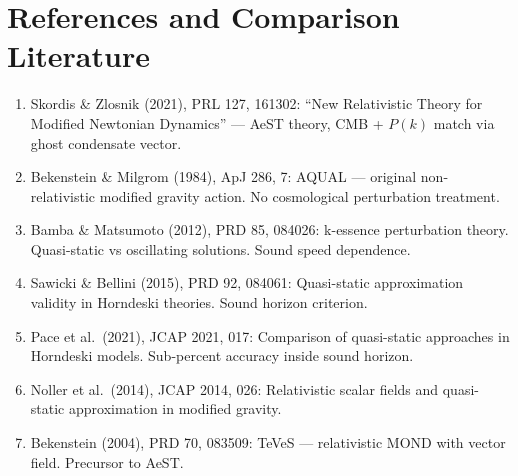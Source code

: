 \documentclass[11pt]{article}
\begin{document}
\section*{References and Comparison Literature}

\begin{enumerate}[nosep]
\item Skordis \& Zlosnik (2021), PRL 127, 161302: ``New Relativistic
  Theory for Modified Newtonian Dynamics'' --- AeST theory, CMB + $P(k)$
  match via ghost condensate vector.
\item Bekenstein \& Milgrom (1984), ApJ 286, 7: AQUAL --- original
  non-relativistic modified gravity action. No cosmological perturbation
  treatment.
\item Bamba \& Matsumoto (2012), PRD 85, 084026: k-essence perturbation
  theory. Quasi-static vs oscillating solutions. Sound speed dependence.
\item Sawicki \& Bellini (2015), PRD 92, 084061: Quasi-static
  approximation validity in Horndeski theories. Sound horizon criterion.
\item Pace et al.\ (2021), JCAP 2021, 017: Comparison of quasi-static
  approaches in Horndeski models. Sub-percent accuracy inside sound
  horizon.
\item Noller et al.\ (2014), JCAP 2014, 026: Relativistic scalar fields
  and quasi-static approximation in modified gravity.
\item Bekenstein (2004), PRD 70, 083509: TeVeS --- relativistic MOND
  with vector field. Precursor to AeST.
\end{enumerate}
\end{document}
